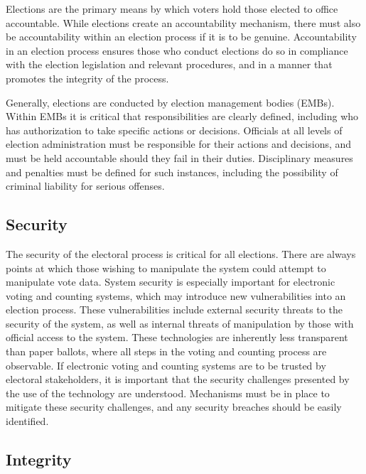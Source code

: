 \documentclass{article}
\begin{document}
Elections are the primary means by which voters hold those elected to office accountable. While elections create an accountability mechanism, there must also be accountability within an election process if it is to be genuine. Accountability in an election process ensures those who conduct elections do so in compliance with the election legislation and relevant procedures, and in a manner that promotes the integrity of the process. \par
Generally, elections are conducted by election management bodies (EMBs). Within EMBs it is critical that responsibilities are clearly defined, including who has authorization to take specific actions or decisions. Officials at all levels of election administration must be responsible for their actions and decisions, and must be held accountable should they fail in their duties. Disciplinary measures and penalties must be defined for such instances, including the possibility of criminal liability for serious offenses.

\subsection{Security}

The security of the electoral process is critical for all elections. There are always points at which those wishing to manipulate the system could attempt to manipulate vote data. System security is especially important for electronic voting and counting systems, which may introduce new vulnerabilities into an election process. These vulnerabilities include external security threats to the security of the system, as well as internal threats of manipulation by those with official access to the system. These technologies are inherently less transparent than paper ballots, where all steps in the voting and counting process are observable. If electronic voting and counting systems are to be trusted by electoral stakeholders, it is important that the security challenges presented by the use of the technology are understood. Mechanisms must be in place to mitigate these security challenges, and any security breaches should be easily identified.

\subsection{Integrity}
\end{document}
